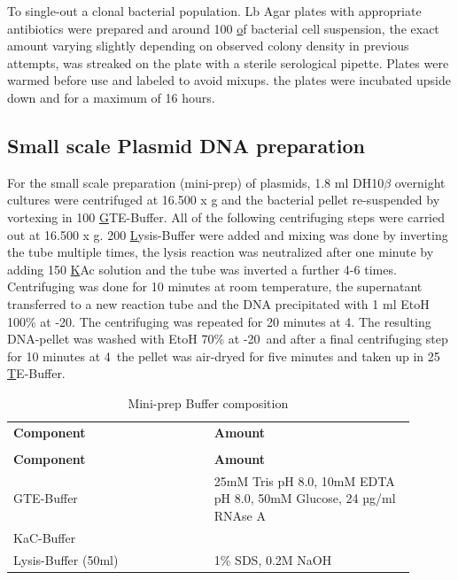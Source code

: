 To single-out a clonal bacterial population. Lb Agar plates with appropriate antibiotics were prepared and around 100 \ul of bacterial cell suspension, the exact amount varying slightly depending on observed colony density in previous attempts, was streaked on the plate with a sterile serological pipette. Plates were warmed before use and labeled to avoid mixups. the plates were incubated upside down and for a maximum of 16 hours.

\subsection{Small scale Plasmid DNA preparation}
For the small scale preparation (mini-prep) of plasmids, 1.8 ml DH10\(\beta\) overnight cultures were centrifuged at 16.500 x g and the bacterial pellet re-suspended by vortexing in 100 \ul GTE-Buffer. All of the following centrifuging steps were carried out at 16.500 x g. 200 \ul Lysis-Buffer were added and mixing was done by inverting the tube multiple times, the lysis reaction was neutralized after one minute by adding 150 \ul KAc solution and the tube was inverted a further 4-6 times. Centrifuging was done for 10 minutes at room temperature, the supernatant transferred to a new reaction tube and the DNA precipitated with 1 ml EtoH 100\% at -20\C. The centrifuging was repeated for 20 minutes at 4\C. The resulting DNA-pellet was washed with EtoH 70\% at -20\C \ and after a final centrifuging step for 10 minutes at 4\C \, the pellet was air-dryed for five minutes and taken up in 25 \ul TE-Buffer.

\begin{longtable}[ht]{L{0.45\linewidth} R{0.45\linewidth}}
\caption{Mini-prep Buffer composition}
\label{Mini-prep Buffer}
\\
\toprule
{}
\textbf{Component}& \textbf{Amount}\\                           
\midrule
\endfirsthead
{}
\caption[]{Mini-prep Buffer composition}
\\
\midrule
{}
\textbf{Component}& \textbf{Amount}\\ 
\midrule
\endhead
\bottomrule
\endfoot
GTE-Buffer & 25mM Tris pH 8.0,  10mM EDTA pH 8.0, 50mM Glucose, 24 µg/ml RNAse A \\
KaC-Buffer &  \\
Lysis-Buffer (50ml) &  1\% SDS, 0.2M NaOH      \\
\end{longtable}

